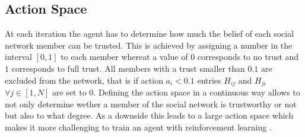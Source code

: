 \documentclass[11pt, a4paper]{article}
\newcommand{\matr}[1]{\bm{\mathit{#1}}}
\begin{document}
\subsection{Action Space}
At each iteration the agent has to determine how much the belief of each social network member can be trusted. This is achieved by assigning a number in the interval $[0,1]$ to each member whereat a value of $0$ corresponds to no trust and $1$ corresponds to full trust. All members with a trust smaller than $0.1$ are excluded from the network, that is if action $a_i<0.1$ entries $\matr{H}_{ij}$ and $\matr{H}_{ji}$ $\forall j \in [1,N]$ are set to $0$. \newline
Defining the action space in a continuous way allows to not only determine wether a member of the social network is trustworthy or not but also to what degree. As a downside this leads to a large action space which makes it more challenging to train an agent with reinforcement learning \cite{large_action_2,large_action_1}.
\end{document}
